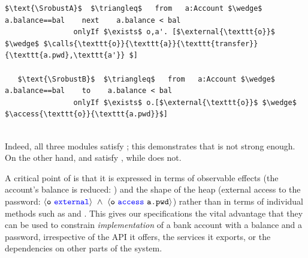 %
%
%
%
%
%
\begin{lstlisting}[language = Chainmail, mathescape=true, frame=lines]
   $\text{\SrobustA}$  $\triangleq$   from   a:Account $\wedge$ a.balance==bal    next    a.balance < bal
                onlyIf $\exists$ o,a'. [$\external{\texttt{o}}$ $\wedge$ $\calls{\texttt{o}}{\texttt{a}}{\texttt{transfer}}{\texttt{a.pwd},\texttt{a'}} $]    
                
   $\text{\SrobustB}$  $\triangleq$   from   a:Account $\wedge$ a.balance==bal    to    a.balance < bal
                onlyIf $\exists$ o.[$\external{\texttt{o}}$ $\wedge$ $\access{\texttt{o}}{\texttt{a.pwd}}$]    
           
\end{lstlisting}
%
%
% 

 {Indeed, all three modules   satisfy  \SrobustA;  this demonstrates that \SrobustA is not
strong enough. On the other hand, \ModA and \ModC satisfy \SrobustB, while \ModB does not.  }

A critical point of \SrobustB %
is that it is
expressed in terms of observable effects (the account's balance is
reduced: ) and the shape of the heap 
(external access to the password:
$\external{\prg{o}}\ \wedge\ \access{\prg{o}}{\prg{a.pwd}}$) 
rather than in terms of individual methods such as
 and .
This gives our specifications the
vital advantage that they can be used to constrain
\textit{implementation} of a bank account with a balance and a
password, irrespective of the API it
offers, the services it exports, or the dependencies on other parts of
the system.

